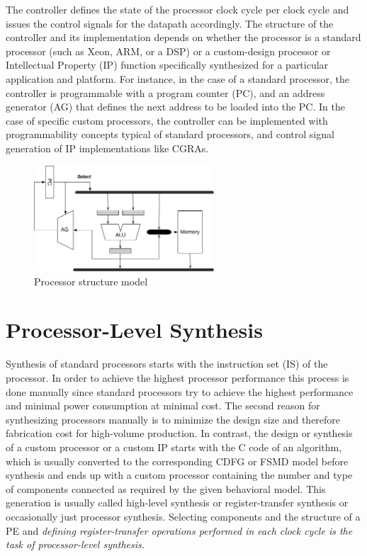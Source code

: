 The controller defines the state of the processor clock cycle per clock cycle and issues the control signals for the datapath accordingly.
The structure of the controller and its implementation depends on whether the processor is a standard processor (such as Xeon, ARM, or a DSP) or a custom-design processor or Intellectual Property (IP) function specifically synthesized for a particular application and platform.
For instance, in the case of a standard processor, the controller is programmable with a program counter (PC), and an address generator (AG) that defines the next address to be loaded into the PC.
In the case of specific custom processors, the controller can be implemented with programmability concepts typical of standard processors, and control signal generation of IP implementations like CGRAs.

\begin{figure}[h]
    \centering
    \includegraphics[width=0.6\textwidth]{figures/Introduction/Processor_Structure.pdf}
    \caption{Processor structure model}
    \label{fig:proc_structure}
\end{figure}



\section{Processor-Level Synthesis}

Synthesis of standard processors starts with the instruction set (IS) of the processor.
In order to achieve the highest processor performance this process is done manually since standard processors try to achieve the highest performance and minimal power consumption at minimal cost.
The second reason for synthesizing processors manually is to minimize the design size and therefore fabrication cost for high-volume production.
In contrast, the design or synthesis of a custom processor or a custom IP starts with the C code of an algorithm, which is usually converted to the corresponding CDFG or FSMD model before synthesis and ends up with a custom processor containing the number and type of components connected as required by the given behavioral model.
This generation is usually called high-level synthesis or register-transfer synthesis or occasionally just processor synthesis.
Selecting components and the structure of a PE and \emph{defining register-transfer operations performed in each clock cycle is the task of processor-level synthesis.}

